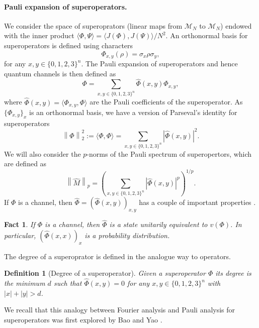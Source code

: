 \documentclass[11pt]{article}
\newcommand{\norm}[1]{\left\|{#1}\right\|}
\theoremstyle{plain}
\newtheorem{dfn}{Definition}
\newtheorem{fact}[theorem]{Fact}
\theoremstyle{plain}
\theoremstyle{definition}
\theoremstyle{remark}
\theoremstyle{named}
\begin{document}
\paragraph{Pauli expansion of superoperators.} We consider the space of superoprators (linear maps from $\mathcal{M}_N$ to $\mathcal{M}_N$) endowed with the inner product $\langle \Phi, \Psi \rangle = \langle J(\Phi), J(\Psi)\rangle/N^2$.  An orthonormal basis for superoperators is defined using characters
\begin{equation}
    \Phi_{x,y}(\rho) = \sigma_x \rho \sigma_y,
\end{equation}
for any $x,y \in \{0,1,2,3\}^n$. The Pauli expansion of superoperators and hence quantum channels is then defined as
\begin{equation}
    \Phi = \sum \limits_{x,y \in \{0,1,2,3\}^n} \widehat{\Phi}(x,y) \Phi_{x,y},
\end{equation}
where  $\widehat{\Phi}(x,y) = \langle \Phi_{x,y}, \Phi \rangle$ are the Pauli coefficients of the superoperator. As $\{\Phi_{x,y}\}_x$ is an orthonormal basis, we have a version of Parseval's identity for superoperators
\begin{equation*}
    \norm{\Phi}_2^2:=\langle \Phi,\Phi\rangle=\sum_{x,y\in\{0,1,2,3\}^n}|\widehat\Phi(x,y)|^2.
\end{equation*} 
We will also consider the $p$-norms of the Pauli spectrum of superopertors, which are defined as $$\norm{\widehat M}_p=\left(\sum_{x,y\in\{0,1,2,3\}^n}|\widehat \Phi(x,y)|^p\right)^{1/p}.$$
If $\Phi$ is a channel, then $\widehat\Phi=(\widehat\Phi(x,y))_{x,y}$ has a couple of important properties \cite[Lemma 8]{bao2023nearly}. 
\begin{fact}
    If $\Phi$ is a channel, then $\widehat\Phi$ is a state unitarily equivalent to $v(\Phi)$. In particular, $(\widehat\Phi(x,x))_x$ is a probability distribution. 
\end{fact}
\noindent The degree of a superoprator is defined in the analogue way to operators. 
\begin{dfn}[Degree of a superoperator]\label{def:superop}
Given a superoperator $\Phi$ its degree is the minimum $d$ such that $\widehat{\Phi}(x,y)=0$ for any $x,y \in \{0,1,2,3\}^n$ with $|x|+|y|>d$.
\end{dfn}  

We recall that this analogy between Fourier analysis and Pauli analysis for superoperators was first explored by Bao and Yao \cite{bao2023nearly}.
\end{document}
